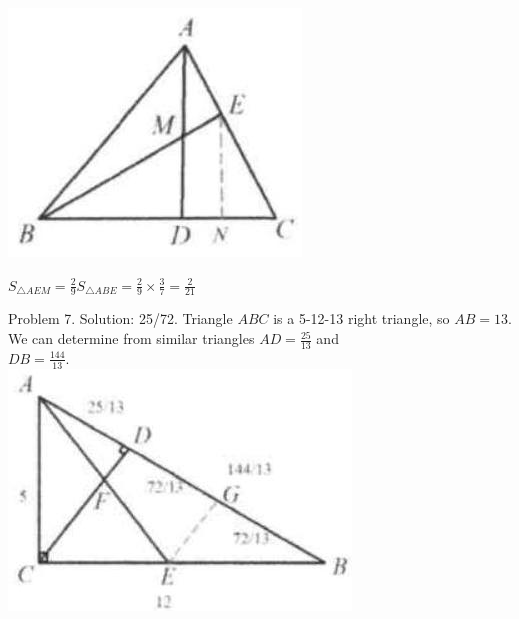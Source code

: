 \documentclass[10pt]{article}
\begin{document}
\includegraphics[max width=\textwidth, center]{2025_04_17_97bc1f7e44d93c271a88g-133(2)}


\(S_{\triangle A E M}=\frac{2}{9} S_{\triangle A B E}=\frac{2}{9} \times \frac{3}{7}=\frac{2}{21}\)

Problem 7. Solution: 25/72.
Triangle \(A B C\) is a 5-12-13 right triangle, so \(A B=13\).\\
We can determine from similar triangles \(A D=\frac{25}{13}\) and\\
\(D B=\frac{144}{13}\).\\
\includegraphics[max width=\textwidth, center]{2025_04_17_97bc1f7e44d93c271a88g-134}
\end{document}
